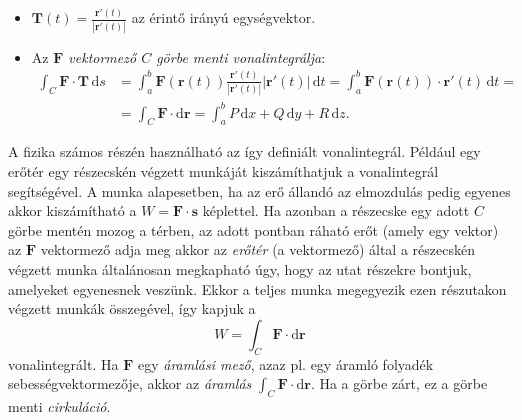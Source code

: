 \documentclass[%
	DIV=15,appendixprefix]{scrreprt}
\theoremstyle{definition}
\theoremstyle{remark}
\begin{document}
\begin{description}
\begin{itemize}
\begin{equation*}
					\mathbf{ x } \right)
					= P \left( x,{} y,{} z \right) \mathbf{ i } + Q \left( x,{} y,{} z \right)
					\mathbf{ j } + R \left( x,{} y,{} z \right) \mathbf{ k }.
				\end{equation*}
			\item $ \mathbf{ T } \left( t \right) = \frac{ \mathbf{ r }' \left( t \right) }{ \left|
				\mathbf{ r }' \left( t \right) \right| }$ az érintő irányú egységvektor.
			\item Az \emph{$ \mathbf{ F } $ vektormező $ C $ görbe menti vonalintegrálja}:
				\begin{align*}
					\int_{ C } \mathbf{ F } \cdot \mathbf{ T } \, \mathrm{ d } s &= \int_{ a }^{ b }
					\mathbf{ F } \left(
					\mathbf{ r } \left( t \right) \right) \frac{ \mathbf{ r }' \left( t
					\right) }{ \left| \mathbf{ r }' \left( t \right) \right| } \left| \mathbf{ r }'
					\left( t \right) \right| \, \mathrm{ d } t = \int_{ a }^{ b } \mathbf{ F }
					\left(
					\mathbf{ r } \left( t \right) \right) \cdot  \mathbf{ r }' \left( t \right) \,
					\mathrm{ d } t =\\
					&=\int_{ C } \mathbf{ F } \cdot \mathrm{ d } \mathbf{ r } = \int_{ a }^{ b } P
					\, \mathrm{ d } x + Q \, \mathrm{ d } y + R \, \mathrm{ d } z.
				\end{align*}
		\end{itemize}
\end{description}
A fizika számos részén használható az így definiált vonalintegrál. Például egy erőtér egy részecskén
végzett munkáját kiszámíthatjuk a vonalintegrál segítségével. A munka alapesetben, ha az erő állandó
az elmozdulás pedig egyenes akkor kiszámítható a $ W = \mathbf{ F } \cdot \mathbf{ s } $ képlettel.
Ha azonban a részecske egy adott $ C $ görbe mentén mozog a térben, az adott pontban ráható erőt
(amely egy vektor) az $ \mathbf{ F } $ vektormező adja meg akkor az \emph{erőtér} (a vektormező)
által a részecskén
végzett munka általánosan megkapható úgy, hogy az utat  részekre bontjuk,
amelyeket egyenesnek veszünk. Ekkor a teljes munka megegyezik ezen részutakon végzett munkák
összegével, így kapjuk a
\begin{equation*}
	W = \int_{ C } \mathbf{ F } \cdot \mathrm{ d } \mathbf{ r }
\end{equation*}
vonalintegrált. Ha $ \mathbf{ F } $ egy \emph{áramlási mező}, azaz pl. egy áramló folyadék
sebességvektormezője, akkor az \emph{áramlás} $ \int_{ C } \mathbf{ F } \cdot \mathrm{ d }
\mathbf{ r } $. Ha a görbe zárt, ez a görbe menti \emph{cirkuláció}.
\end{document}
